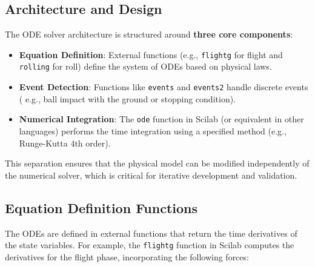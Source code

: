 \documentclass[10pt,a4paper]{report}
\begin{document}
\subsection{Architecture and Design}
\label{subsec:ode_architecture}

The ODE solver architecture is structured around \textbf{three core components}:
\begin{itemize}
    \item \textbf{Equation Definition}: External functions (e.g., \texttt{flightg} for flight and \texttt{rolling} 
    for roll) define the system of ODEs based on physical laws.
    \item \textbf{Event Detection}: Functions like \texttt{events} and \texttt{events2} handle discrete events (
        e.g., ball impact with the ground or stopping condition).
    \item \textbf{Numerical Integration}: The \texttt{ode} function in Scilab (or equivalent in other languages) 
    performs the time integration using a specified method (e.g., Runge-Kutta 4th order).
\end{itemize}

This separation ensures that the physical model can be modified independently of the numerical solver, which is 
critical for iterative development and validation.


\subsection{Equation Definition Functions}
\label{subsec:equation_functions}

The ODEs are defined in external functions that return the time derivatives of the state variables. For example, the \texttt{flightg} function in Scilab computes the derivatives for the flight phase, incorporating the following forces:
\end{document}
